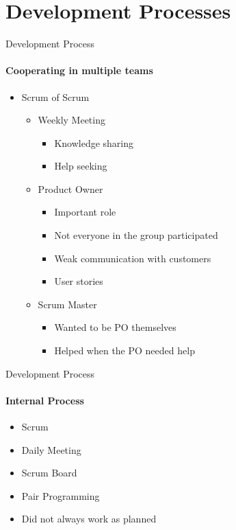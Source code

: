 \section{Development Processes}
    \begin{frame}[t]{Development Process}\framesubtitle{Cooperating in multiple teams}
    \begin{itemize}
        \item Scrum of Scrum
        	\begin{itemize}
        		\item Weekly Meeting
    			\begin{itemize}
        			\item Knowledge sharing 
        			\item Help seeking
        		\end{itemize}
        		\item Product Owner        			
    			\begin{itemize}
        			\item Important role
        			\item Not everyone in the group participated
        			\item Weak communication with customers
        			\item User stories
        		\end{itemize}
        		\item Scrum Master
        		\begin{itemize}
        			\item Wanted to be PO themselves
        			\item Helped when the PO needed help
        		\end{itemize}
    		\end{itemize}
    \end{itemize}
	\end{frame}

	\begin{frame}[t]{Development Process}\framesubtitle{Internal Process}
    \begin{itemize}
        \item Scrum
        \item Daily Meeting
        \item Scrum Board
        \item Pair Programming
        \item Did not always work as planned
    \end{itemize}
	\end{frame}

